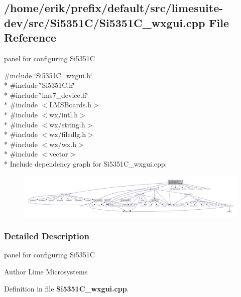 \subsection{/home/erik/prefix/default/src/limesuite-\/dev/src/\+Si5351\+C/\+Si5351\+C\+\_\+wxgui.cpp File Reference}
\label{Si5351C__wxgui_8cpp}


panel for configuring Si5351C  


{\ttfamily \#include \char`\"{}Si5351\+C\+\_\+wxgui.\+h\char`\"{}}\\*
{\ttfamily \#include \char`\"{}Si5351\+C.\+h\char`\"{}}\\*
{\ttfamily \#include \char`\"{}lms7\+\_\+device.\+h\char`\"{}}\\*
{\ttfamily \#include $<$L\+M\+S\+Boards.\+h$>$}\\*
{\ttfamily \#include $<$wx/intl.\+h$>$}\\*
{\ttfamily \#include $<$wx/string.\+h$>$}\\*
{\ttfamily \#include $<$wx/filedlg.\+h$>$}\\*
{\ttfamily \#include $<$wx/wx.\+h$>$}\\*
{\ttfamily \#include $<$vector$>$}\\*
Include dependency graph for Si5351\+C\+\_\+wxgui.\+cpp\+:
\nopagebreak
\begin{figure}[H]
\begin{center}
\leavevmode
\includegraphics[width=350pt]{dd/d3d/Si5351C__wxgui_8cpp__incl}
\end{center}
\end{figure}


\subsubsection{Detailed Description}
panel for configuring Si5351C 

\begin{DoxyAuthor}{Author}
Lime Microsystems 
\end{DoxyAuthor}


Definition in file {\bf Si5351\+C\+\_\+wxgui.\+cpp}.

